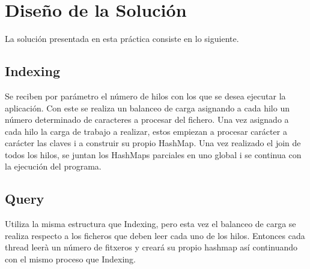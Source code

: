 \documentclass{article}
\begin{document}
\section{Diseño de la Solución}
La solución presentada en esta práctica consiste en lo siguiente.
\subsection{Indexing}
Se reciben por parámetro el número de hilos con los que se desea ejecutar la aplicación. Con este se realiza un balanceo de carga asignando a cada hilo un número determinado de caracteres a procesar del fichero. Una vez asignado a cada hilo la carga de trabajo a realizar, estos empiezan a procesar carácter a carácter las claves i a construir su propio HashMap. Una vez realizado el join de todos los hilos, se juntan los HashMaps parciales en uno global i se continua con la ejecución del programa.
\subsection{Query}
Utiliza la misma estructura que Indexing, pero esta vez el balanceo de carga se realiza respecto a los ficheros que deben leer cada uno de los hilos. Entonces cada thread leerà un número de fitxeros y creará su propio hashmap así continuando con el mismo proceso que Indexing.
\end{document}
